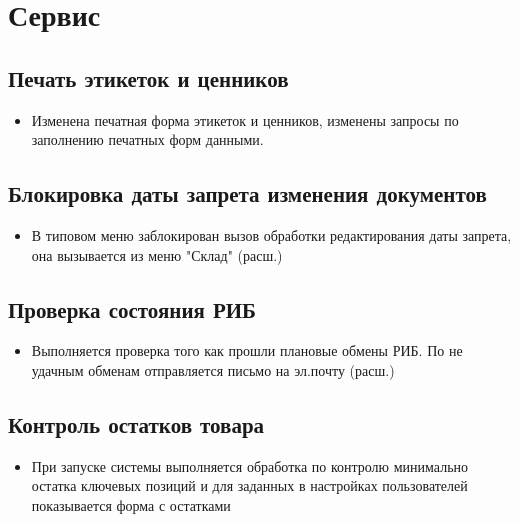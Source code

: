 \section{Сервис}
\subsection{Печать этикеток и ценников}


\begin{itemize}
	\item Изменена печатная форма этикеток и ценников, изменены запросы по заполнению печатных форм данными.
\end{itemize}


\subsection{Блокировка даты запрета изменения документов}

\begin{itemize}
	\item В типовом меню заблокирован вызов обработки редактирования даты запрета, она вызывается из  меню "Склад"
	(расш.)
\end{itemize}


\subsection{Проверка состояния РИБ}

\begin{itemize}
	\item Выполняется проверка того как прошли плановые обмены РИБ. По не удачным обменам отправляется письмо на эл.почту
	(расш.)
\end{itemize}

\subsection{Контроль остатков товара}
\begin{itemize}
	\item При запуске системы выполняется обработка по контролю минимально остатка ключевых позиций и для заданных в настройках пользователей показывается форма с остатками
\end{itemize}



